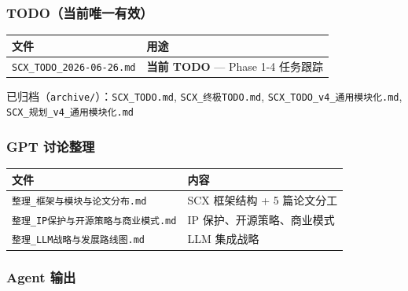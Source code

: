 \documentclass[
  12pt,
]{ctexart}
\begin{document}
\subsubsection{TODO（当前唯一有效）}\label{todoux5f53ux524dux552fux4e00ux6709ux6548}

\begin{longtable}[]{@{}ll@{}}
\toprule\noalign{}
文件 & 用途 \\
\midrule\noalign{}
\endhead
\bottomrule\noalign{}
\endlastfoot
\texttt{SCX\_TODO\_2026-06-26.md} & \textbf{当前 TODO} --- Phase 1-4
任务跟踪 \\
\end{longtable}

已归档（\texttt{archive/}）：\texttt{SCX\_TODO.md},
\texttt{SCX\_终极TODO.md}, \texttt{SCX\_TODO\_v4\_通用模块化.md},
\texttt{SCX\_规划\_v4\_通用模块化.md}

\subsubsection{GPT 讨论整理}\label{gpt-ux8ba8ux8bbaux6574ux7406}

\begin{longtable}[]{@{}ll@{}}
\toprule\noalign{}
文件 & 内容 \\
\midrule\noalign{}
\endhead
\bottomrule\noalign{}
\endlastfoot
\texttt{整理\_框架与模块与论文分布.md} & SCX 框架结构 + 5 篇论文分工 \\
\texttt{整理\_IP保护与开源策略与商业模式.md} & IP
保护、开源策略、商业模式 \\
\texttt{整理\_LLM战略与发展路线图.md} & LLM 集成战略 \\
\end{longtable}

\subsubsection{Agent 输出}\label{agent-ux8f93ux51fa}
\end{document}
